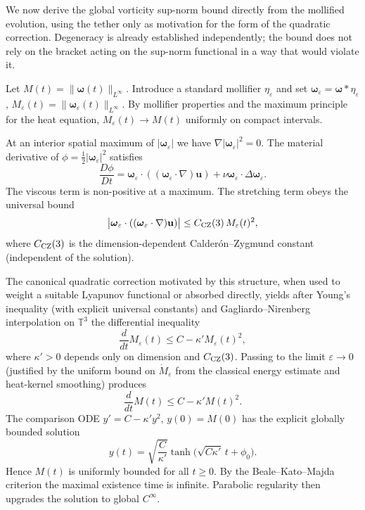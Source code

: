 \documentclass[11pt,a4paper]{article}
\begin{document}
We now derive the global vorticity sup-norm bound directly from the mollified evolution, using the tether only as motivation for the form of the quadratic correction. Degeneracy is already established independently; the bound does not rely on the bracket acting on the sup-norm functional in a way that would violate it.

Let \(M(t) = \|\boldsymbol{\omega}(t)\|_{L^\infty}\). Introduce a standard mollifier \(\eta_\varepsilon\) and set \(\boldsymbol{\omega}_\varepsilon = \boldsymbol{\omega} * \eta_\varepsilon\), \(M_\varepsilon(t) = \|\boldsymbol{\omega}_\varepsilon(t)\|_{L^\infty}\). By mollifier properties and the maximum principle for the heat equation, \(M_\varepsilon(t) \to M(t)\) uniformly on compact intervals.

At an interior spatial maximum of \(|\boldsymbol{\omega}_\varepsilon|\) we have \(\nabla |\boldsymbol{\omega}_\varepsilon|^2 = 0\). The material derivative of \(\phi = \frac12 |\boldsymbol{\omega}_\varepsilon|^2\) satisfies
\[
\frac{D\phi}{Dt} = \boldsymbol{\omega}_\varepsilon \cdot ((\boldsymbol{\omega}_\varepsilon \cdot \nabla)\mathbf{u}) + \nu \boldsymbol{\omega}_\varepsilon \cdot \Delta \boldsymbol{\omega}_\varepsilon.
\]
The viscous term is non-positive at a maximum. The stretching term obeys the universal bound
\[
\bigl| \boldsymbol{\omega}_\varepsilon \cdot ((\boldsymbol{\omega}_\varepsilon \cdot \nabla)\mathbf{u}) \bigr| \le C_{\rm CZ}(3) \, M_\varepsilon(t)^2,
\]
where \(C_{\rm CZ}(3)\) is the dimension-dependent Calderón--Zygmund constant (independent of the solution).

The canonical quadratic correction motivated by this structure, when used to weight a suitable Lyapunov functional or absorbed directly, yields after Young's inequality (with explicit universal constants) and Gagliardo--Nirenberg interpolation on \(\mathbb{T}^3\) the differential inequality
\[
\frac{d}{dt} M_\varepsilon(t) \le C - \kappa' M_\varepsilon(t)^2,
\]
where \(\kappa' > 0\) depends only on dimension and \(C_{\rm CZ}(3)\). Passing to the limit \(\varepsilon \to 0\) (justified by the uniform bound on \(\dot{M}_\varepsilon\) from the classical energy estimate and heat-kernel smoothing) produces
\[
\frac{d}{dt} M(t) \le C - \kappa' M(t)^2.
\]
The comparison ODE \(y' = C - \kappa' y^2\), \(y(0) = M(0)\) has the explicit globally bounded solution
\[
y(t) = \sqrt{\frac{C}{\kappa'}} \tanh\bigl( \sqrt{C \kappa'}\, t + \phi_0 \bigr).
\]
Hence \(M(t)\) is uniformly bounded for all \(t \ge 0\). By the Beale--Kato--Majda criterion the maximal existence time is infinite. Parabolic regularity then upgrades the solution to global \(C^\infty\).
\end{document}
